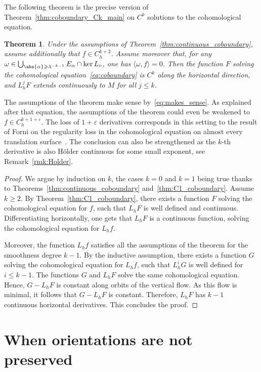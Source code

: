 \documentclass[11pt, a4paper, oneside, final, pagebackref]{amsart}
\renewcommand{\epsilon}{\varepsilon}
\renewcommand{\leq}{\leqslant}
\renewcommand{\geq}{\geqslant}
\newtheorem{thm}{Theorem}[section]
\theoremstyle{definition}
\numberwithin{equation}{section}
\begin{document}
The following theorem is the precise version of
Theorem~\ref{thm:coboundary_Ck_main} on $C^k$ solutions to the cohomological
equation.
\begin{thm}
\label{thm:coboundary_Ck} Under the assumptions of
Theorem~\ref{thm:continuous_coboundary}, assume additionally that $f \in
C^{k+2}_h$. Assume moreover that, for any $\omega \in \bigcup_{\abs{\alpha}
\geq \lambda^{-k-1}} E_\alpha \cap \ker L_v$, one has $\langle \omega, f
\rangle = 0$. Then the function $F$ solving the cohomological
equation~\eqref{eq:coboundary} is $C^k$ along the horizontal direction, and
$L^j_h F$ extends continuously to $M$ for all $j\leq k$.
\end{thm}
The assumptions of the theorem make sense by~\eqref{eq:makes_sense}. As
explained after that equation, the assumptions of the theorem could even be
weakened to $f \in C^{k+1+\epsilon}_h$. The loss of $1+\epsilon$ derivatives
corresponds in this setting to the result of Forni on the regularity loss in
the cohomological equation on almost every translation
surface~\cite{forni_regularity}. The conclusion can also be strengthened as
the $k$-th derivative is also H\"older continuous for some small exponent, see
Remark~\ref{rmk:Holder}.
\begin{proof}
We argue by induction on $k$, the cases $k=0$ and $k=1$ being true thanks to
Theorems~\ref{thm:continuous_coboundary} and~\ref{thm:C1_coboundary}. Assume
$k\geq 2$. By Theorem~\ref{thm:C1_coboundary}, there exists a function $F$
solving the cohomological equation for $f$, such that $L_h F$ is well defined
and continuous. Differentiating horizontally, one gets that $L_h F$ is a
continuous function, solving the cohomological equation for $L_h f$.

Moreover, the function $L_h f$ satisfies all the assumptions of the theorem
for the smoothness degree $k-1$. By the inductive assumption, there exists a
function $G$ solving the cohomological equation for $L_h f$, such that $L_h^i
G$ is well defined for $i \leq k-1$. The functions $G$ and $L_h F$ solve the
same cohomological equation. Hence, $G-L_h F$ is constant along orbits of the
vertical flow. As this flow is minimal, it follows that $G-L_h F$ is
constant. Therefore, $L_h F$ has $k-1$ continuous horizontal derivatives.
This concludes the proof.
\end{proof}


\section{When orientations are not preserved}
\label{sec:orientations}
\end{document}
